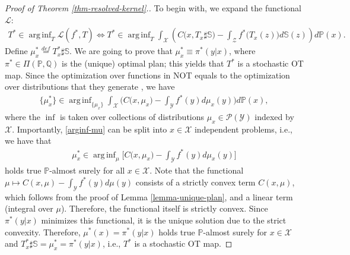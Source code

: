 \documentclass{article} %
\DeclareMathOperator*{\arginf}{arg\,inf}
\begin{document}
\begin{proof}[Proof of Theorem \ref{thm-resolved-kernel}.] To begin with, we expand the functional $\mathcal{L}$:
\begin{eqnarray}
    T^{*}\in\arginf_{T}\mathcal{L}(f^{*},T)\Longleftrightarrow T^{*}\in \arginf_{T}\int_{\mathcal{X}} \left( C\big(x,T_{x}\sharp\mathbb{S}\big)-\int_{\mathcal{Z}} f^{*}\big(T_{x}(z)\big) d\mathbb{S}(z)\right) d\mathbb{P}(x).
    \label{arginf-T-expanded}
\end{eqnarray}
Define $\mu_{x}^{*}\stackrel{def}{=}T^{*}_{x}\sharp\mathbb{S}$. We are going to prove that $\mu_{x}^{*}\equiv \pi^{*}(y|x)$, where $\pi^{*}\in\Pi(\mathbb{P},\mathbb{Q})$ is the (unique) optimal plan; this yields that $T^{*}$ is a stochastic OT map. Since the optimization over functions in NOT equals to the optimization over distributions that they generate \citep[]{korotin2023neural}, we have
\begin{eqnarray}
    \{\mu_{x}^{*}\}\in \arginf_{\{\mu_{x}\}}\int_{\mathcal{X}} \big( C\big(x,\mu_{x}\big)-\int_{\mathcal{Y}} f^{*}(y) d\mu_{x}(y)\big) d\mathbb{P}(x),
    \label{arginf-mu}
\end{eqnarray}
where the $\inf$ is taken over collections of distributions $\mu_{x}\in\mathcal{P}(\mathcal{Y})$ indexed by $\mathcal{X}$. Importantly, \eqref{arginf-mu} can be split into $x\in\mathcal{X}$ independent problems, i.e., we have that
\begin{eqnarray}
    \mu_{x}^{*}\in\arginf_{\mu}\big[C\big(x,\mu_{x}\big)-\int_{\mathcal{Y}} f^{*}(y) d\mu_{x}(y)\big]
    \label{arginf-mu-sep}
\end{eqnarray}
holds true $\mathbb{P}$-almost surely for all $x\in\mathcal{X}$. Note that the functional $\mu\mapsto C(x,\mu)-\int_{\mathcal{Y}}f^{*}(y)d\mu(y)$ consists of a strictly convex term $C(x,\mu)$, which follows from the proof of Lemma \ref{lemma-unique-plan}, and a linear term (integral over $\mu$). Therefore, the functional itself is strictly convex. Since $\pi^{*}(y|x)$ minimizes this functional, it is the unique solution due to the strict convexity. Therefore, $\mu^{*}(x)=\pi^{*}(y|x)$ holds true $\mathbb{P}$-almost surely for $x\in\mathcal{X}$ and $T^{*}_{x}\sharp\mathbb{S}=\mu_{x}^{*}=\pi^{*}(y|x)$, i.e., $T^{*}$ is a stochastic OT map.
\end{proof}
\end{document}

